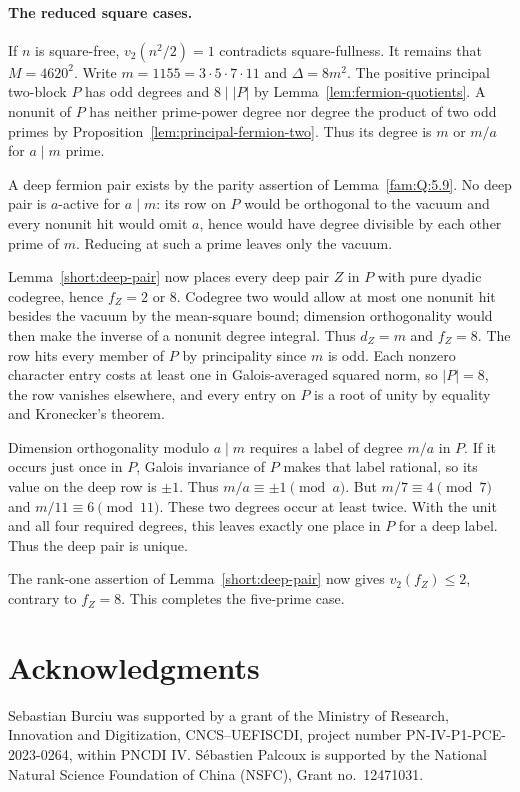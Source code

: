 \documentclass[11pt,a4paper]{article}
\numberwithin{equation}{section}
\theoremstyle{remark}
\begin{document}
\paragraph{The reduced square cases.}
If $n$ is square-free, $v_2(n^2/2)=1$ contradicts square-fullness.
It remains that $M=4620^2$. Write $m=1155=3\cdot5\cdot7\cdot11$ and
$\Delta=8m^2$. The positive principal two-block $P$ has odd degrees
and $8\mid |P|$ by Lemma~\ref{lem:fermion-quotients}. A nonunit
of $P$ has neither prime-power degree nor degree the product of two
odd primes by Proposition~\ref{lem:principal-fermion-two}. Thus its
degree is $m$ or $m/a$ for $a\mid m$ prime.

A deep fermion pair exists by the parity assertion of Lemma~\ref{fam:Q:5.9}.
No deep pair is $a$-active for $a\mid m$: its row on $P$ would be
orthogonal to the vacuum and every nonunit hit would omit $a$, hence
would have degree divisible by each other prime of $m$. Reducing
at such a prime leaves only the vacuum.

Lemma~\ref{short:deep-pair} now places every deep pair $Z$ in $P$ with
pure dyadic codegree, hence $f_Z=2$ or $8$. Codegree two would allow at
most one nonunit hit besides the vacuum by the mean-square bound;
dimension orthogonality would then make the inverse of a nonunit degree
integral. Thus $d_Z=m$ and $f_Z=8$. The row hits every member of $P$ by
principality since $m$ is odd. Each nonzero character entry costs at least one
in Galois-averaged squared norm, so $|P|=8$, the row vanishes elsewhere,
and every entry on $P$ is a root of unity by equality and Kronecker's theorem.

Dimension orthogonality modulo $a\mid m$ requires a label of degree
$m/a$ in $P$. If it occurs just once in $P$, Galois invariance of $P$
makes that label rational, so its value on the deep row is $\pm1$.
Thus $m/a\equiv\pm1\pmod a$. But $m/7\equiv4\pmod7$ and
$m/11\equiv6\pmod{11}$. These two degrees occur at least twice.
With the unit and all four required degrees, this leaves exactly
one place in $P$ for a deep label. Thus the deep pair is unique.

The rank-one assertion of Lemma~\ref{short:deep-pair} now gives
$v_2(f_Z)\le2$, contrary to $f_Z=8$. This completes the five-prime case.

\section*{Acknowledgments}
Sebastian Burciu was supported by a grant of the Ministry of Research,
Innovation and Digitization, CNCS--UEFISCDI, project number
PN-IV-P1-PCE-2023-0264, within PNCDI IV.
S\'ebastien Palcoux is supported by the National Natural Science
Foundation of China (NSFC), Grant no.~12471031.
\end{document}
